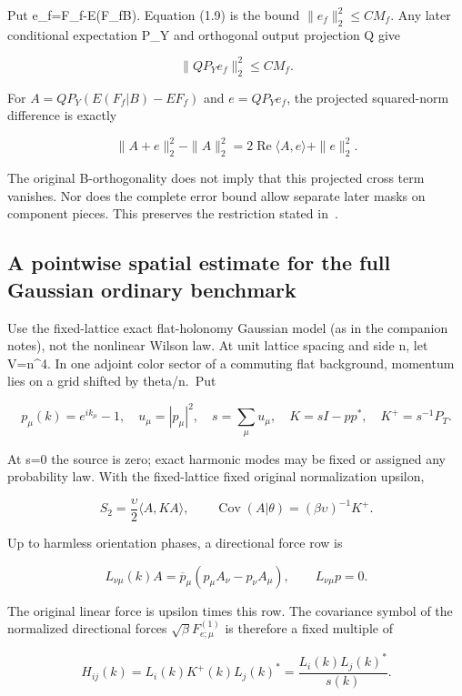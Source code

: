 \documentclass[
  11pt,
]{article}
\begin{document}
Put e\_f=F\_f-E(F\_f\textbar B). Equation (1.9) is the bound
\(\|e_f\|_2^2\le CM_f\). Any later conditional expectation P\_Y and
orthogonal output projection Q give

\[
 \|QP_Ye_f\|_2^2\le CM_f.
\]

For \(A=QP_Y(E(F_f|B)-EF_f)\) and \(e=QP_Ye_f\), the projected
squared-norm difference is exactly

\[
 \|A+e\|_2^2-\|A\|_2^2
 =2\operatorname{Re}\langle A,e\rangle+\|e\|_2^2.
\tag{1.11}
\]

The original B-orthogonality does not imply that this projected cross
term vanishes. Nor does the complete error bound allow separate later
masks on component pieces. This preserves the restriction stated
in~\cite{CT}.

\hypertarget{a-pointwise-spatial-estimate-for-the-full-gaussian-ordinary-benchmark}{%
\subsection{A pointwise spatial estimate for the full Gaussian ordinary
benchmark}\label{a-pointwise-spatial-estimate-for-the-full-gaussian-ordinary-benchmark}}

Use the fixed-lattice exact flat-holonomy Gaussian model (as in the companion
notes), not the nonlinear Wilson law. At unit lattice spacing and
side n, let V=n\^{}4. In one adjoint color sector of a commuting flat
background, momentum lies on a grid shifted by theta/n.~Put

\[
 p_\mu(k)=e^{ik_\mu}-1,\quad
 u_\mu=|p_\mu|^2,\quad s=\sum_\mu u_\mu,\quad
 K=sI-pp^*,\quad K^+=s^{-1}P_T.
\]

At s=0 the source is zero; exact harmonic modes may be fixed or assigned
any probability law. With the fixed-lattice fixed original normalization
upsilon,

\[
 S_2=\frac\upsilon2\langle A,KA\rangle,
 \qquad \operatorname{Cov}(A|\theta)=(\beta\upsilon)^{-1}K^+.
\]

Up to harmless orientation phases, a directional force row is

\[
 L_{\nu\mu}(k)A
 =\overline p_\mu(p_\mu A_\nu-p_\nu A_\mu),
 \qquad L_{\nu\mu}p=0.
\tag{2.1}
\]

The original linear force is upsilon times this row. The covariance
symbol of the normalized directional forces
\(\sqrt\beta F_{e;\mu}^{(1)}\) is therefore a fixed multiple of

\[
 H_{ij}(k)=L_i(k)K^+(k)L_j(k)^*
          =\frac{L_i(k)L_j(k)^*}{s(k)}.
\tag{2.2}
\]
\end{document}
